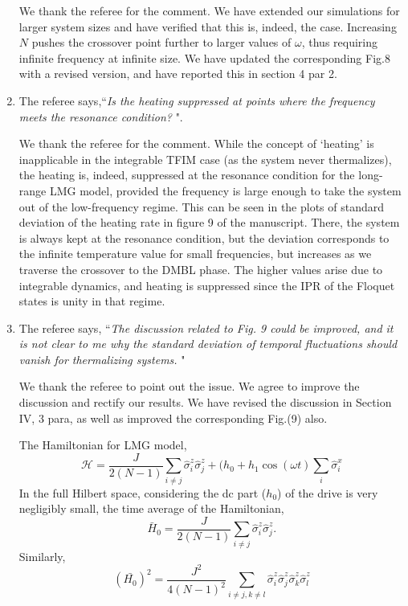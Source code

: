 \documentclass[aps,prb,reprint,showpacs,floatfix,superscriptaddress, onecolumn, nofootinbib, 9pt]{revtex4-2}
\newcommand{\response}[1]{{\color{blue}#1}} %
\begin{document}
\begin{enumerate}
		\response{    	
			We thank the referee for the comment. We have extended our simulations for larger system sizes and have verified that this is, indeed, the case. Increasing $N$ pushes the crossover point further to larger values of $\omega$, thus requiring infinite frequency at infinite size. We have updated the corresponding Fig.8 with a revised version, and have reported this in section 4 par 2.
		}
		\item The referee says,``\textit{Is the heating suppressed at points where the frequency meets the resonance condition? }".
		
		\response{
		We thank the referee for the comment. While the concept of `heating' is inapplicable in the integrable TFIM case (as the system never thermalizes), the heating is, indeed, suppressed at the resonance condition for the long-range LMG model, provided the frequency is large enough to take the system out of the low-frequency regime. This can be seen in the plots of standard deviation of the heating rate in figure 9 of the manuscript. There, the system is always kept at the resonance condition, but the deviation corresponds to the infinite temperature value for small frequencies, but increases as we traverse the crossover to the DMBL phase. The higher values arise due to integrable dynamics, and heating is suppressed since the IPR of the Floquet states is unity in that regime.}
		
		\item The referee says, ``\textit{The discussion related to Fig. 9 could be improved, and it is not clear to me why the standard deviation of temporal fluctuations should vanish for thermalizing systems. }"\\
		
		\response{ We thank the referee to point out the issue. We agree to improve the discussion and rectify our results. We have revised the discussion in Section IV, 3 para, as well as improved the corresponding Fig.(9) also.
			
			
			The Hamiltonian for LMG model,
			\begin{equation}
				\mathcal{H} = \frac{J}{2(N-1)}\sum_{i\neq j}\hat{\sigma}^z_i \hat{\sigma}^z_j + (h_0 +h_1 \cos(\omega t) \sum_i \hat{\sigma}^x_i
			\end{equation}
			In the full Hilbert space, considering the dc part ($h_0$) of the drive is very negligibly small, the time average of the Hamiltonian,
			\begin{equation*}
				\bar{H}_0 = \frac{J}{2(N-1)}\sum_{i\neq j}\hat{\sigma}^z_i \hat{\sigma}^z_j.
			\end{equation*}
			Similarly,
			\begin{equation}
				\left(\bar{H_0}\right)^2 = \frac{J^2}{4(N-1)^2}\sum_{i\neq j, k \neq l} \hat{\sigma}^z_i \hat{\sigma}^z_j \hat{\sigma}^z_k \hat{\sigma}^z_l
			\end{equation}
			
}
\end{enumerate}
\end{document}
